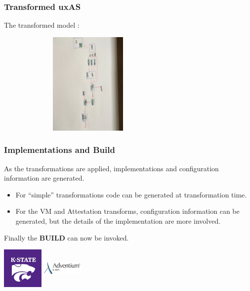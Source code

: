 \documentclass{beamer}
\begin{document}
\begin{frame}\frametitle{Transformed uxAS}

The transformed model :

\includegraphics[width=90mm,height=50mm]{final-arch.jpg}

\end{frame}

\begin{frame}\frametitle{Implementations and Build}

As the transformations are applied, implementations and
configuration information are generated.

\begin{itemize}

  \item For ``simple'' transformations code can be generated at transformation time.
  \item For the VM and Attestation transforms, configuration
    information can be generated, but the details of the
    implementation are more involved.
\end{itemize}

Finally the \textbf{BUILD} can now be invoked.

\includegraphics[width=20mm,height=20mm]{ksu.jpg}
\includegraphics[width=20mm,height=20mm]{adventium.png}


\end{frame}
\end{document}
